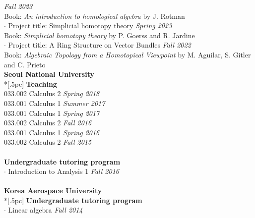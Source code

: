 \documentclass{article}
\begin{document}
 \hfill {\it Fall 2023 \/}\\
\hspace*{1em} Book: {\it An introduction to homological algebra} by J. Rotman\\
$\cdot$ Project title: Simplicial homotopy theory \hfill {\it Spring 2023 \/}\\
\hspace*{1em} Book: {\it Simplicial homotopy theory} by P. Goerss and R. Jardine\\
$\cdot$ Project title: A Ring Structure on Vector Bundles \hfill {\it Fall 2022 \/}\\
\hspace*{1em} Book: {\it Algebraic Topology from a Homotopical Viewpoint } by  M. Aguilar, S. Gitler and C. Prieto\\

{\bf \large Seoul National University} \\*[.5pc]
{\bf Teaching} \\
033.002 Calculus 2  \hfill {\it Spring 2018\/}\\
033.001 Calculus 1  \hfill {\it Summer 2017\/}\\
033.001 Calculus 1  \hfill {\it Spring 2017\/}\\
033.002 Calculus 2  \hfill {\it Fall 2016  \/}\\
033.001 Calculus 1  \hfill {\it Spring 2016\/}\\
033.002 Calculus 2  \hfill {\it Fall 2015 \/}\\ \\
{\bf Undergraduate tutoring program} \\
$\cdot$ Introduction to Analysis 1  \hfill {\it Fall 2016 \/}\\
\\
{\bf \large Korea Aerospace University} \\*[.5pc]
{\bf Undergraduate tutoring program }\\
$\cdot$ Linear algebra \hfill {\it Fall 2014 \/}\\
\\ 
\end{document}
